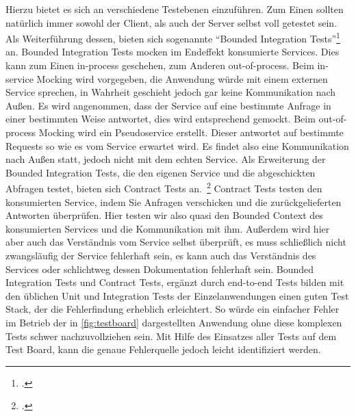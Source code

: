 Hierzu bietet es sich an verschiedene Testebenen einzuführen. Zum Einen sollten natürlich immer sowohl der Client, als auch der Server selbst voll getestet sein. Als Weiterführung dessen, bieten sich sogenannte ``Bounded Integration Tests''\footcite[vgl.][]{rails:soa} an. Bounded Integration Tests mocken im Endeffekt konsumierte Services. Dies kann zum Einen in-process geschehen, zum Anderen out-of-process. Beim in-service Mocking wird vorgegeben, die Anwendung würde mit einem externen Service sprechen, in Wahrheit geschieht jedoch gar keine Kommunikation nach Außen. Es wird angenommen, dass der Service auf eine bestimmte Anfrage in einer bestimmten Weise antwortet, dies wird entsprechend gemockt. Beim out-of-process Mocking wird ein Pseudoservice erstellt. Dieser antwortet auf bestimmte Requests so wie es vom Service erwartet wird. Es findet also eine Kommunikation nach Außen statt, jedoch nicht mit dem echten Service.
Als Erweiterung der Bounded Integration Tests, die den eigenen Service und die abgeschickten Abfragen testet, bieten sich Contract Tests an.~\footcite[vgl.][]{fowler:contracts} Contract Tests testen den konsumierten Service, indem Sie Anfragen verschicken und die zurückgelieferten Antworten überprüfen. Hier testen wir also quasi den Bounded Context des konsumierten Services und die Kommunikation mit ihm. Außerdem wird hier aber auch das Verständnis vom Service selbst überprüft, es muss schließlich nicht zwangsläufig der Service fehlerhaft sein, es kann auch das Verständnis des Services oder schlichtweg dessen Dokumentation fehlerhaft sein.
Bounded Integration Tests und Contract Tests, ergänzt durch end-to-end Tests bilden mit den üblichen Unit und Integration Tests der Einzelanwendungen einen guten Test Stack, der die Fehlerfindung erheblich erleichtert. So würde ein einfacher Fehler im Betrieb der in \autoref{fig:testboard} dargestellten Anwendung ohne diese komplexen Tests schwer nachzuvollziehen sein. Mit Hilfe des Einsatzes aller Tests auf dem Test Board, kann die genaue Fehlerquelle jedoch leicht identifiziert werden.


